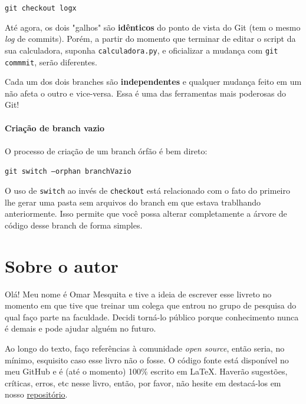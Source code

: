 \documentclass{article}
\begin{document}
  \vspace{1ex}
  \texttt{git checkout logx}
  \vspace{1ex}

  Até agora, os dois "galhos" são \textbf{idênticos} do ponto de vista do Git (tem o mesmo \textit{log} de commits). 
  Porém, a partir do momento que terminar de editar o script da sua calculadora, suponha \texttt{calculadora.py}, e oficializar a mudança 
  com \texttt{git commmit}, serão diferentes. 

  Cada um dos dois branches são \textbf{independentes} e qualquer mudança feito em um não afeta o outro e vice-versa. 
  Essa é uma das ferramentas mais poderosas do Git!

  \paragraph{Criação de branch vazio}
  \paragraph{}

  O processo de criação de um branch órfão é bem direto: 

  \vspace{1ex}
  \texttt{git switch --orphan branchVazio}
  \vspace{1ex}

  O uso de \texttt{switch} ao invés de \texttt{checkout} está relacionado com o fato do primeiro lhe gerar uma pasta 
  sem arquivos do branch em que estava trablhando anteriormente. Isso permite que você possa alterar completamente a 
  árvore de código desse branch de forma simples.

  \newpage
  \section{Sobre o autor}

  Olá! Meu nome é Omar Mesquita e tive a ideia de escrever esse livreto no momento em que tive que treinar um colega que entrou 
  no grupo de pesquisa do qual faço parte na faculdade. Decidi torná-lo público porque conhecimento nunca é demais 
  e pode ajudar alguém no futuro. 

  Ao longo do texto, faço referências à comunidade \textit{open source}, então seria, no mínimo, esquisito caso esse livro não o fosse.
  O código fonte está disponível no meu GitHub e é (até o momento) 100\% escrito em \LaTeX. Haverão sugestões, críticas, erros, etc nesse livro, 
  então, por favor, não hesite em destacá-los em nosso \href{https://github.com/OmarMesqq/livro}{repositório}. 
\end{document}
